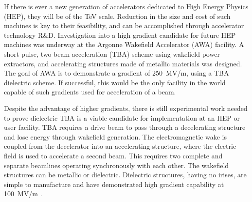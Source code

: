 \documentclass{iitthesis}
\begin{document}
 \label{sec:motivation}
If there is ever a new generation of accelerators dedicated to High Energy Physics
(HEP), they will be of the TeV scale. Reduction in the size and cost
of such machines is key to their feasibility, and can be accomplished
through accelerator technology R\&D. Investigation into a 
high gradient candidate for future HEP machines was underway
at the Argonne Wakefield Accelerator (AWA) facility. A
short pulse, two-beam acceleration (TBA) scheme using 
wakefield power extractors, and accelerating structures made 
of metallic materials was designed. 
The goal of AWA is to demonstrate a gradient of
\SI{250}{MV/m}, using a TBA dielectric scheme. If successful, this would
be the only facility in the world capable of such gradients used for
acceleration of a beam.

Despite the advantage of higher gradients, there is still experimental work
needed to prove dielectric TBA is a viable candidate for implementation at an HEP or user facility.
TBA requires a drive beam to pass through a decelerating structure and
lose energy through wakefield generation. The electromagnetic wake
is coupled from the decelerator into an accelerating structure, where
the electric field is used to accelerate a second beam. This requires
two complete and separate beamlines operating synchronously with each other.  
The wakefield structures can be metallic or dielectric. Dielectric
structures, having no irises, are simple to manufacture and have demonstrated
high gradient capability at \SI{100}{MV/m} \cite{WeiPaper}. 
\end{document}
